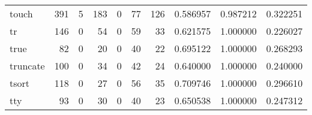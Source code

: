 \begin{tabular}{lrrrrrrrrr}
touch     &                                                391 &                                                  5 &                                                183 &                                                  0 &                                                 77 &                                                126 &                                           0.586957 &                               0.987212 &                             0.322251 \\
tr        &                                                146 &                                                  0 &                                                 54 &                                                  0 &                                                 59 &                                                 33 &                                           0.621575 &                               1.000000 &                             0.226027 \\
true      &                                                 82 &                                                  0 &                                                 20 &                                                  0 &                                                 40 &                                                 22 &                                           0.695122 &                               1.000000 &                             0.268293 \\
truncate  &                                                100 &                                                  0 &                                                 34 &                                                  0 &                                                 42 &                                                 24 &                                           0.640000 &                               1.000000 &                             0.240000 \\
tsort     &                                                118 &                                                  0 &                                                 27 &                                                  0 &                                                 56 &                                                 35 &                                           0.709746 &                               1.000000 &                             0.296610 \\
tty       &                                                 93 &                                                  0 &                                                 30 &                                                  0 &                                                 40 &                                                 23 &                                           0.650538 &                               1.000000 &                             0.247312 \\

\end{tabular}
